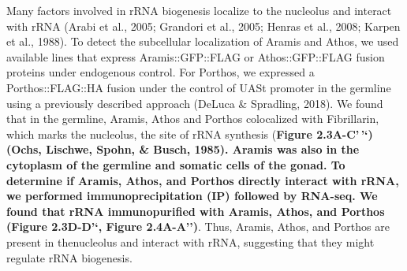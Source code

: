 \documentclass[12pt,oneside]{reedthesis}
\begin{document}
Many factors involved in rRNA biogenesis localize to the nucleolus and interact with rRNA (Arabi et al., 2005; Grandori et al., 2005; Henras et al., 2008; Karpen et al., 1988). To detect the subcellular localization of Aramis and Athos, we used available lines that express Aramis::GFP::FLAG or Athos::GFP::FLAG fusion proteins under endogenous control. For Porthos, we expressed a Porthos::FLAG::HA fusion under the control of UASt promoter in the germline using a previously described approach (DeLuca \& Spradling, 2018). We found that in the germline, Aramis, Athos and Porthos colocalized with Fibrillarin, which marks the nucleolus, the site of rRNA synthesis (\textbf{Figure 2.3A-C'\,'`\textbf{) (Ochs, Lischwe, Spohn, \& Busch, 1985). Aramis was also in the cytoplasm of the germline and somatic cells of the gonad. To determine if Aramis, Athos, and Porthos directly interact with rRNA, we performed immunoprecipitation (IP) followed by RNA-seq. We found that rRNA immunopurified with Aramis, Athos, and Porthos }(Figure 2.3D-D'`, Figure 2.4A-A'')}. Thus, Aramis, Athos, and Porthos are present in thenucleolus and interact with rRNA, suggesting that they might regulate rRNA biogenesis.
\end{document}
